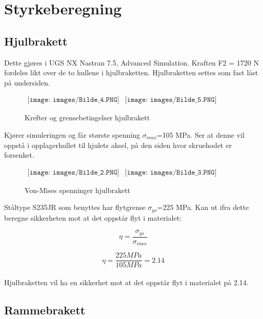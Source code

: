 \section{Styrkeberegning}
\subsection{Hjulbrakett}
Dette gjøres i UGS NX Nastran 7.5, Advanced Simulation. Kraften F2 = 1720 N fordeles likt over de to hullene i hjulbraketten. Hjulbraketten settes som fast låst på undersiden.

\begin{figure}[H]
\begin{center}$
\begin{array}{ccc}
\texttt{[image: images/Bilde\_4.PNG]} &
\texttt{[image: images/Bilde\_5.PNG]} &  
\end{array}$
\end{center}
\caption{Krefter og grensebetingelser hjulbrakett}
\end{figure}

Kjører simuleringen og får største spenning $\sigma_{max}$=105 MPa. Ser at denne vil oppstå i opplagerhullet til hjulets aksel, på den siden hvor skruehodet er forsenket.

\begin{figure}[H]
\begin{center}$
\begin{array}{ccc}
\texttt{[image: images/Bilde\_2.PNG]} &
\texttt{[image: images/Bilde\_3.PNG]} &  
\end{array}$
\end{center}
\caption{Von-Mises spenninger hjulbrakett}
\end{figure}

Ståltype S235JR som benyttes har flytgrense $\sigma_{ys}$=225 MPa. Kan ut ifra dette beregne sikkerheten mot at det oppstår flyt i materialet:

\begin{equation}
\eta=\frac{\sigma_{ys}}{\sigma_{max}}
\end{equation}

\begin{equation}
\eta=\frac{225 MPa}{105 MPa}=2.14
\end{equation}\\

Hjulbraketten vil ha en sikkerhet mot at det oppstår flyt i materialet på 2.14.

\subsection{Rammebrakett}

